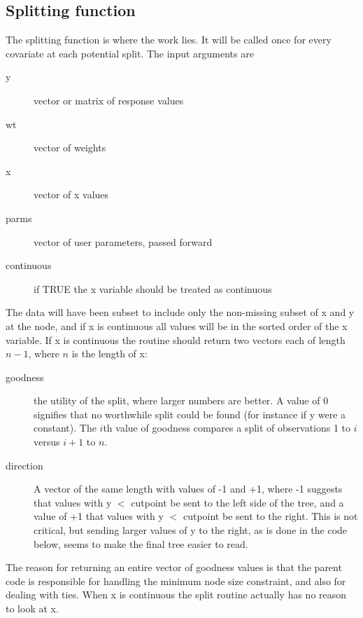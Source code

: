 \subsection{Splitting function}
The splitting function is where the work lies.
It will be called once for every covariate at each potential split.
The input arguments are
\begin{description}
  \item[y] vector or matrix of response values
  \item[wt] vector of weights
  \item[x] vector of x values
  \item[parms] vector of user parameters, passed forward
  \item[continuous] if TRUE the x variable should be treated as continuous
  \end{description}

The data will have been subset to include only the non-missing subset
of x and y at the node, and if x is continuous all values will be in the
sorted order of the x variable.
If x is continuous the routine should return two vectors each of
length $n-1$, where $n$ is the length of x:
\begin{description}
  \item[goodness] the utility of the split, where larger numbers are
    better.  A value of 0 signifies that no worthwhile split could be
    found (for instance if y were a constant).  The $i$th value of
    goodness compares a split of observations 1 to $i$ versus $i+1$ to $n$.
    \item[direction]  A vector of the same length with values of -1
      and +1, where -1 suggests that values with y $<$ cutpoint be
      sent to the left side of the tree, and a value of +1 that values
      with y $<$ cutpoint be sent to the right.
      This is not critical, but sending larger values of y to the
      right, as is done in the code below, seems to make the final tree
      easier to read.
\end{description}

The reason for returning an entire vector of goodness values is that
the parent code is responsible for handling the minimum node size
constraint, and also for dealing with ties.  When x is continuous the
split routine actually has no reason to look at x.

\Rcodeplaceholder{}

